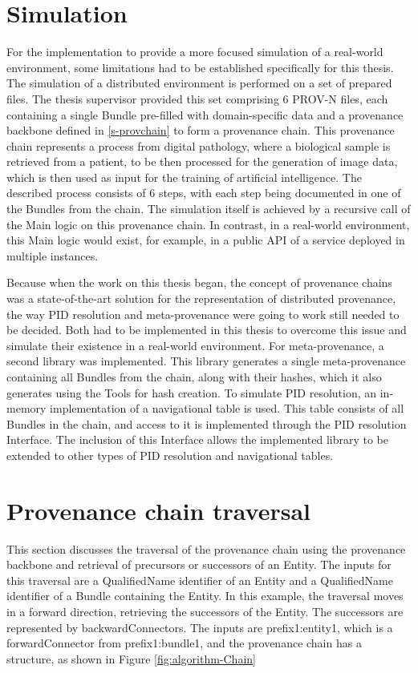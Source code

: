 \documentclass[
  digital,     %
  oneside,     %
  nosansbold,  %
  nocolorbold, %
  lof,         %
  lot,         %
]{fithesis4}
\begin{document}
\section{Simulation} \label{s-simulation}
\shorthandoff{-}
For the implementation to provide a more focused simulation of a real-world environment, some limitations had to be established specifically for this thesis. The simulation of a distributed environment is performed on a set of prepared files. The thesis supervisor provided this set comprising 6 PROV-N files, each containing a single Bundle pre-filled with domain-specific data and a provenance backbone defined in \ref{s-provchain} to form a provenance chain. This provenance chain represents a process from digital pathology, where a biological sample is retrieved from a patient, to be then processed for the generation of image data, which is then used as input for the training of artificial intelligence. The described process consists of 6 steps, with each step being documented in one of the Bundles from the chain. The simulation itself is achieved by a recursive call of the Main logic on this provenance chain. In contrast, in a real-world environment, this Main logic would exist, for example, in a public API of a service deployed in multiple instances. 

Because when the work on this thesis began, the concept of provenance chains was a state-of-the-art solution for the representation of distributed provenance, the way PID resolution and meta-provenance were going to work still needed to be decided. Both had to be implemented in this thesis to overcome this issue and simulate their existence in a real-world environment. For meta-provenance, a second library was implemented. This library generates a single meta-provenance containing all Bundles from the chain, along with their hashes, which it also generates using the Tools for hash creation. To simulate PID resolution, an in-memory implementation of a navigational table is used. This table consists of all Bundles in the chain, and access to it is implemented through the PID resolution Interface. The inclusion of this Interface allows the implemented library to be extended to other types of PID resolution and navigational tables.
\shorthandon{-}

\section{Provenance chain traversal}
\shorthandoff{-}
This section discusses the traversal of the provenance chain using the provenance backbone and retrieval of precursors or successors of an Entity. The inputs for this traversal are a QualifiedName identifier of an Entity and a QualifiedName identifier of a Bundle containing the Entity. In this example, the traversal moves in a forward direction, retrieving the successors of the Entity. The successors are represented by backwardConnectors. The inputs are prefix1:entity1, which is a forwardConnector from prefix1:bundle1, and the provenance chain has a structure, as shown in Figure \ref{fig:algorithm-Chain}
\end{document}
